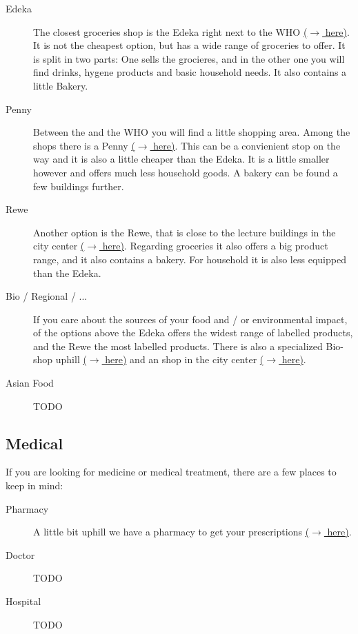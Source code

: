 \begin{description}
    \item[Edeka]
    The closest groceries shop is the Edeka right next to the WHO \href{https://maps.app.goo.gl/DTd9KutteiG8m5L1A}{($\xrightarrow{}$ here)}. It is not the cheapest option, but has a wide range of groceries to offer. It is split in two parts: One sells the grocieres, and in the other one you will find drinks, hygene products and basic household needs. It also contains a little Bakery.

    \item[Penny]
    Between the  and the WHO you will find a little shopping area. Among the shops there is a Penny \href{https://maps.app.goo.gl/7F1s1fUtsefv49gv8}{($\xrightarrow{}$ here)}. This can be a convienient stop on the way and it is also a little cheaper than the Edeka. It is a little smaller however and offers much less household goods. A bakery can be found a few buildings further.

    \item[Rewe]
    Another  option is the Rewe, that is close to the lecture buildings in the city center \href{https://maps.app.goo.gl/Sj6d82QsJSTaGCuv5}{($\xrightarrow{}$ here)}. Regarding groceries it also offers a big product range, and it also contains a bakery. For household it is also less equipped than the Edeka.

    \item[Bio / Regional / ...]
    If you care about the sources of your food and / or environmental impact, of the options above the Edeka offers the widest range of  labelled products, and the Rewe the most  labelled products. There is also a specialized Bio-shop uphill \href{https://maps.app.goo.gl/EEEsyTK1hGbJ5H1B6}{($\xrightarrow{}$ here)} and an  shop in the city center \href{https://maps.app.goo.gl/8ppTPAT6ZfP2TXeg6}{($\xrightarrow{}$ here)}.

    \item[Asian Food]
    {\color{darkred} TODO}
\end{description}

\subsection{Medical}
If you are looking for medicine or medical treatment, there are a few places to keep in mind:

\begin{description}
    \item[Pharmacy]
    A little bit uphill we have a pharmacy to get your prescriptions \href{https://maps.app.goo.gl/cpDLc9VZ7XukpgS18}{($\xrightarrow{}$ here)}.
    \item[Doctor]
    {\color{darkred} TODO}
    \item[Hospital]
    {\color{darkred} TODO}
\end{description}

